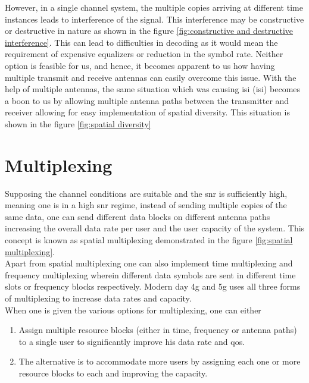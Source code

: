 However, in a single channel system, the multiple copies arriving at different time instances leads to interference of the signal. This interference may be constructive or destructive in nature as shown in the figure \ref{fig:constructive and destructive interference}. This can lead to difficulties in decoding as it would mean the requirement of expensive equalizers or reduction in the symbol rate. Neither option is feasible for us, and hence, it becomes apparent to us how having multiple transmit and receive antennas can easily overcome this issue. With the help of multiple antennas, the same situation which was causing \acrlong{isi} (\acrshort{isi}) becomes a boon to us by allowing multiple antenna paths between the transmitter and receiver allowing for easy implementation of \gls{spatial diversity}. This situation is shown in the figure \ref{fig:spatial diversity}\\

\section{Multiplexing}
Supposing the channel conditions are suitable and the \acrshort{snr} is sufficiently high, meaning one is in a high \acrshort{snr} regime, instead of sending multiple copies of the same data, one can send different data blocks on different antenna paths increasing the overall data rate per user and the user capacity of the system. This concept is known as \gls{spatial multiplexing} demonstrated in the figure \ref{fig:spatial multiplexing}.\\

Apart from \gls{spatial multiplexing} one can also implement time multiplexing and frequency multiplexing wherein different data symbols are sent in different time slots or frequency blocks respectively. Modern day \acrshort{4g} and \acrshort{5g} uses all three forms of multiplexing to increase data rates and capacity.\\

When one is given the various options for multiplexing, one can either
\begin{enumerate}
\item Assign multiple resource blocks (either in time, frequency or antenna paths) to a single user to significantly improve his data rate and \acrshort{qos}.
\item The alternative is to accommodate more users by assigning each one or more resource blocks to each and improving the capacity.
\end{enumerate}

